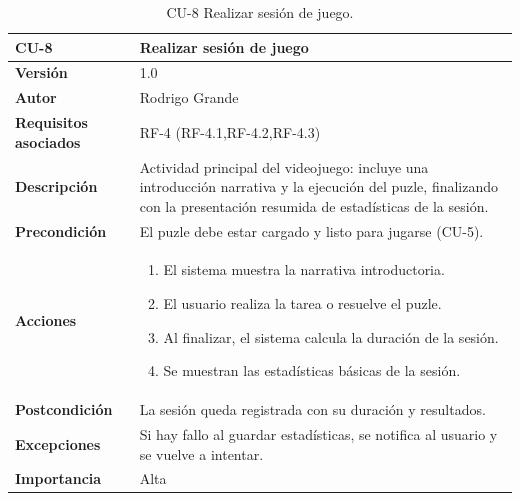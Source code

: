 \begin{table}[p]
	\centering
	\begin{tabularx}{\linewidth}{ p{} p{} }
		\toprule
		\textbf{CU-8} & \textbf{Realizar sesión de juego}\\
		\toprule
		\textbf{Versión}              & 1.0    \\
		\textbf{Autor}                & Rodrigo Grande \\
		\textbf{Requisitos asociados} & RF-4 (RF-4.1,RF-4.2,RF-4.3) \\
		\textbf{Descripción}          & Actividad principal del videojuego: incluye una introducción narrativa y la ejecución del puzle, finalizando con la presentación resumida de estadísticas de la sesión.\\
		\textbf{Precondición}         & El puzle debe estar cargado y listo para jugarse (CU-5). \\
		\textbf{Acciones}             &
		\begin{enumerate}
			\def\labelenumi{\arabic{enumi}.}
			\tightlist
			\item El sistema muestra la narrativa introductoria.
			\item El usuario realiza la tarea o resuelve el puzle.
			\item Al finalizar, el sistema calcula la duración de la sesión.
			\item Se muestran las estadísticas básicas de la sesión.
		\end{enumerate}\\
		\textbf{Postcondición}        & La sesión queda registrada con su duración y resultados. \\
		\textbf{Excepciones}          & Si hay fallo al guardar estadísticas, se notifica al usuario y se vuelve a intentar. \\
		\textbf{Importancia}          & Alta \\
		\bottomrule
	\end{tabularx}
	\caption{CU-8 Realizar sesión de juego.}
	\label{cu:realizar-sesion}
\end{table}

